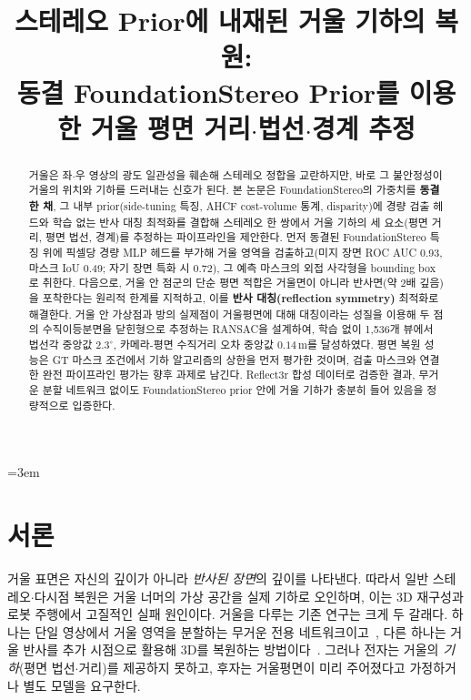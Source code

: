 \documentclass[10pt,a4paper]{article}
\title{스테레오 Prior에 내재된 거울 기하의 복원:\\ 동결 FoundationStereo Prior를 이용한 거울 평면 거리$\cdot$법선$\cdot$경계 추정}
\date{}
\begin{document}
\emergencystretch=3em  %

\begin{abstract}
거울은 좌$\cdot$우 영상의 광도 일관성을 훼손해 스테레오 정합을 교란하지만, 바로 그 불안정성이 거울의 위치와 기하를 드러내는 신호가 된다. 본 논문은 FoundationStereo의 가중치를 \textbf{동결한 채}, 그 내부 prior(side-tuning 특징, AHCF cost-volume 통계, disparity)에 경량 검출 헤드와 학습 없는 반사 대칭 최적화를 결합해 스테레오 한 쌍에서 거울 기하의 세 요소(평면 거리, 평면 법선, 경계)를 추정하는 파이프라인을 제안한다. 먼저 동결된 FoundationStereo 특징 위에 픽셀당 경량 MLP 헤드를 부가해 거울 영역을 검출하고(미지 장면 ROC AUC 0.93, 마스크 IoU 0.49; 자기 장면 특화 시 0.72), 그 예측 마스크의 외접 사각형을 bounding box로 취한다. 다음으로, 거울 안 점군의 단순 평면 적합은 거울면이 아니라 반사면(약 2배 깊음)을 포착한다는 원리적 한계를 지적하고, 이를 \textbf{반사 대칭(reflection symmetry)} 최적화로 해결한다. 거울 안 가상점과 방의 실제점이 거울평면에 대해 대칭이라는 성질을 이용해 두 점의 수직이등분면을 닫힌형으로 추정하는 RANSAC을 설계하여, 학습 없이 1{,}536개 뷰에서 법선각 중앙값 $2.3^\circ$, 카메라-평면 수직거리 오차 중앙값 $0.14$\,m를 달성하였다. 평면 복원 성능은 GT 마스크 조건에서 기하 알고리즘의 상한을 먼저 평가한 것이며, 검출 마스크와 연결한 완전 파이프라인 평가는 향후 과제로 남긴다. Reflect3r 합성 데이터로 검증한 결과, 무거운 분할 네트워크 없이도 FoundationStereo prior 안에 거울 기하가 충분히 들어 있음을 정량적으로 입증한다.
\end{abstract}

\maketitle
\begingroup
\renewcommand{\thefootnote}{\fnsymbol{footnote}}%
\endgroup

\section{서론}

거울 표면은 자신의 깊이가 아니라 \emph{반사된 장면}의 깊이를 나타낸다. 따라서 일반 스테레오$\cdot$다시점 복원은 거울 너머의 가상 공간을 실제 기하로 오인하며, 이는 3D 재구성과 로봇 주행에서 고질적인 실패 원인이다. 거울을 다루는 기존 연구는 크게 두 갈래다. 하나는 단일 영상에서 거울 영역을 분할하는 무거운 전용 네트워크이고~\cite{mirrornet2019,pmd2020}, 다른 하나는 거울 반사를 추가 시점으로 활용해 3D를 복원하는 방법이다~\cite{mirrorgaussian2024,reflect3r2026}. 그러나 전자는 거울의 \emph{기하}(평면 법선$\cdot$거리)를 제공하지 못하고, 후자는 거울평면이 미리 주어졌다고 가정하거나 별도 모델을 요구한다.
\end{document}
